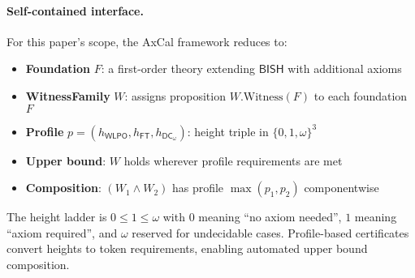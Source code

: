 \documentclass[11pt]{article}
\newcommand{\WLPO}{\mathsf{WLPO}}
\newcommand{\FT}{\mathsf{FT}}
\newcommand{\DCw}{\mathsf{DC}_{\omega}}
\theoremstyle{plain}
\theoremstyle{definition}
\theoremstyle{remark}
\newcommand{\BISH}{\mathsf{BISH}}
\begin{document}
\paragraph{Self-contained interface.}
For this paper's scope, the AxCal framework reduces to:
\begin{itemize}
\item \textbf{Foundation} $F$: a first-order theory extending $\BISH$ with additional axioms
\item \textbf{WitnessFamily} $W$: assigns proposition $W.\mathrm{Witness}(F)$ to each foundation $F$
\item \textbf{Profile} $p = (h_{\WLPO}, h_{\FT}, h_{\DCw})$: height triple in $\{0,1,\omega\}^3$
\item \textbf{Upper bound}: $W$ holds wherever profile requirements are met
\item \textbf{Composition}: $(W_1 \land W_2)$ has profile $\max(p_1, p_2)$ componentwise
\end{itemize}
The height ladder is $0 \leq 1 \leq \omega$ with $0$ meaning ``no axiom needed'', $1$ meaning ``axiom required'', and $\omega$ reserved for undecidable cases. Profile-based certificates convert heights to token requirements, enabling automated upper bound composition.
\end{document}

